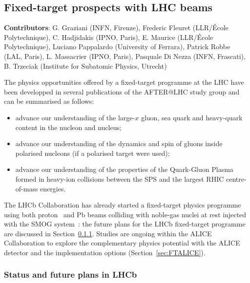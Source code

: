 \documentclass[../report.tex]{subfiles}
\begin{document}


\clearpage
\subsection{Fixed-target prospects with LHC beams}
\label{sec:fixedtarget}
{ \small
\noindent \textbf{Contributors}: G. Graziani (INFN, Firenze), Frederic Fleuret (LLR/{\'E}cole Polytechnique), C. Hadjidakis (IPNO, Paris), E. Maurice (LLR/{\'E}cole Polytechnique),  Luciano Pappalardo (University of Ferrara), Patrick Robbe (LAL, Paris),  L. Massacrier (IPNO, Paris),  Pasquale Di Nezza (INFN, Frascati), B. Trzeciak (Institute for Subatomic Physics, Utrecht)
}

The physics opportunities offered by a fixed-target programme at the LHC have been developped in several publications of the AFTER@LHC study group \cite{Brodsky:2012vg, Lansberg:Adv2015} and can be summarised as follows:
\begin{itemize}
\item advance our understanding of the large-$x$ gluon, sea quark and heavy-quark content in the nucleon and nucleus;
\item advance our understanding of the dynamics and spin of gluons inside polarised nucleons (if a polarised target were used);
\item advance our understanding of the properties of the Quark-Gluon Plasma formed in heavy-ion collisions between the SPS and the largest RHIC centre-of-mass energies.
\end{itemize}
The LHCb Collaboration has already started a fixed-target physics programme using both proton~\cite{Aaij:2018svt,Aaij:2018ogq} and Pb beams colliding with noble-gas nuclei at rest injected with the SMOG system~\cite{SMOG}: the future plans for the LHCb fixed-target programme are discussed in Section~\ref{sec:FTLHCb}. Studies are ongoing within the ALICE Collaboration to explore the complementary physics potential with the ALICE detector and the implementation options (Section~\ref{sec:FTALICE}). 

\subsubsection{Status and future plans in LHCb}
\label{sec:FTLHCb}
\end{document}
